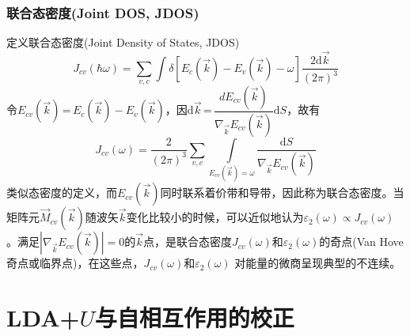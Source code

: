 \documentclass[cjk,slidestop,compress,mathserif,blue]{beamer}
\begin{document}
\frame
{
	\frametitle{联合态密度\textrm{(Joint DOS, JDOS)}}
定义联合态密度(\textrm{Joint Density of States, JDOS})
\begin{displaymath}
  J_{cv}(\hbar\omega)=\sum_{v,c}\int\delta[E_c(\vec k)-E_v(\vec k)-\omega]\frac{2\textrm{d}\vec k}{(2\pi)^3}
  \label{eq:optic-33}
\end{displaymath}
令$E_{cv}(\vec k)$\,=\,$E_c(\vec k)-E_v(\vec k)$，因$\textrm{d}\vec k$\,=\,$\dfrac{dE_{cv}(\vec k)}{\nabla_{\vec k}E_{cv}(\vec k)}\textrm{d}S$，故有
\begin{displaymath}
  J_{cv}(\omega)=\frac2{(2\pi)^3}\sum_{v,c}\int\limits_{E_{cv}(\vec k)=\omega}\frac{\textrm{d}S}{\nabla_{\vec k}E_{cv}(\vec k)}
  \label{eq:optic-34}
\end{displaymath}
类似态密度的定义，而$E_{cv}(\vec k)$同时联系着价带和导带，因此称为联合态密度。当矩阵元$\vec M_{cv}(\vec k)$随波矢$\vec k$变化比较小的时候，可以近似地认为$\varepsilon_2(\omega)\!\propto\!J_{cv}(\omega)$。满足$|\nabla_{\vec k}E_{cv}(\vec k)|\!=\!0$的$\vec k$点，是联合态密度$J_{cv}(\omega)$和$\varepsilon_2(\omega)$的奇点(\textrm{Van Hove}奇点或临界点)，在这些点，$J_{cv}(\omega)$和$\varepsilon_2(\omega)$%
对能量的微商呈现典型的不连续。%
}

\section{\rm{LDA+}$U$与自相互作用的校正}
\end{document}

